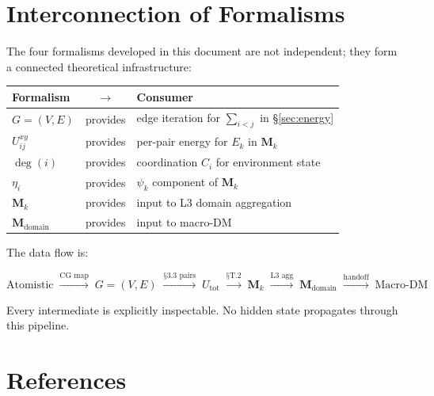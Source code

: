 \documentclass[11pt, a4paper, oneside]{article}
\begin{document}
\section{Interconnection of Formalisms}
\label{sec:interconnection}

The four formalisms developed in this document are not independent;
they form a connected theoretical infrastructure:

\begin{center}
\begin{tabular}{lcl}
\textbf{Formalism} & $\longrightarrow$ & \textbf{Consumer} \\
\midrule
$G = (V, E)$ & provides & edge iteration for $\sum_{i < j}$ in §\ref{sec:energy} \\
$U_{ij}^{xy}$ & provides & per-pair energy for $E_k$ in $\mathbf{M}_k$ \\
$\deg(i)$     & provides & coordination $C_i$ for environment state \\
$\eta_i$      & provides & $\psi_k$ component of $\mathbf{M}_k$ \\
$\mathbf{M}_k$ & provides & input to L3 domain aggregation \\
$\mathbf{M}_{\mathrm{domain}}$ & provides & input to macro-DM \\
\end{tabular}
\end{center}

\noindent The data flow is:

\begin{equation}
\text{Atomistic}
\;\xrightarrow{\text{CG map}}\;
G = (V,E)
\;\xrightarrow{\text{§3.3 pairs}}\;
U_{\mathrm{tot}}
\;\xrightarrow{\text{§T.2}}\;
\mathbf{M}_k
\;\xrightarrow{\text{L3 agg}}\;
\mathbf{M}_{\mathrm{domain}}
\;\xrightarrow{\text{handoff}}\;
\text{Macro-DM}
\label{eq:dataflow}
\end{equation}

Every intermediate is explicitly inspectable.  No hidden state
propagates through this pipeline.


\newpage
\section*{References}
\end{document}
